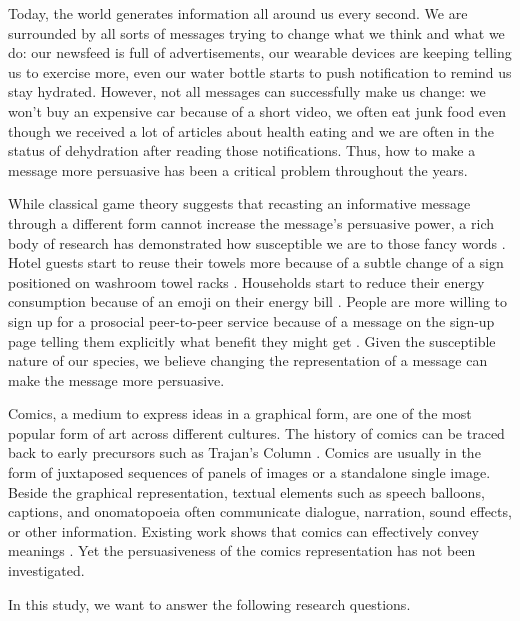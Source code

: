 Today, the world generates information all around us every second. We are surrounded by all sorts of messages trying to change what we think and what we do: our newsfeed is full of advertisements, our wearable devices are keeping telling us to exercise more, even our water bottle starts to push notification to remind us stay hydrated. However, not all messages can successfully make us change: we won't buy an expensive car because of a short video, we often eat junk food even though we received a lot of articles about health eating and we are often in the status of dehydration after reading those notifications. Thus, how to make a message more persuasive has been a critical problem throughout the years.\par
While classical game theory suggests that recasting an informative message through a different form cannot increase the message's persuasive power, a rich body of research has demonstrated how susceptible we are to those fancy words \cite{tversky1992advances,tversky1981framing,goldstein2008room,schultz2007constructive}. Hotel guests start to reuse their towels more because of a subtle change of a sign positioned on washroom towel racks \cite{goldstein2008room}. Households start to reduce their energy consumption because of an emoji on their energy bill \cite{schultz2007constructive}. People are more willing to sign up for a prosocial peer-to-peer service because of a message on the sign-up page telling them explicitly what benefit they might get \cite{vaish2018s}. Given the susceptible nature of our species, we believe changing the representation of a message can make the message more persuasive.\par
Comics, a medium to express ideas in a graphical form, are one of the most popular form of art across different cultures. The history of comics can be traced back to early precursors such as Trajan's Column \cite{o1971art}. Comics are usually in the form of juxtaposed sequences of panels of images or a standalone single image. Beside the graphical representation, textual elements such as speech balloons, captions, and onomatopoeia often communicate dialogue, narration, sound effects, or other information. Existing work shows that comics can effectively convey meanings \cite{McDermottPB18,cary2004going,scott1993understanding}. Yet the persuasiveness of the comics representation has not been investigated.\par

In this study, we want to answer the following research questions.

